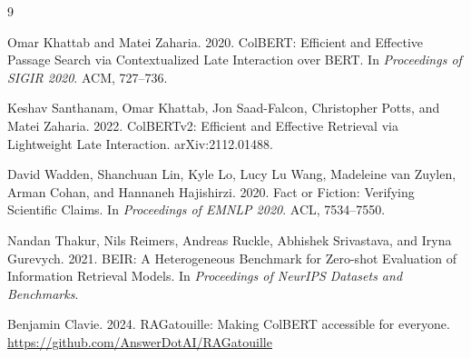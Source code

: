 \documentclass[sigconf,nonacm]{acmart}
\begin{document}
\begin{thebibliography}{9}

Omar Khattab and Matei Zaharia. 2020. ColBERT: Efficient and Effective Passage
Search via Contextualized Late Interaction over BERT. In \textit{Proceedings of
SIGIR 2020}. ACM, 727--736.

Keshav Santhanam, Omar Khattab, Jon Saad-Falcon, Christopher Potts, and Matei
Zaharia. 2022. ColBERTv2: Efficient and Effective Retrieval via Lightweight Late
Interaction. arXiv:2112.01488.

David Wadden, Shanchuan Lin, Kyle Lo, Lucy Lu Wang, Madeleine van Zuylen, Arman
Cohan, and Hannaneh Hajishirzi. 2020. Fact or Fiction: Verifying Scientific
Claims. In \textit{Proceedings of EMNLP 2020}. ACL, 7534--7550.

Nandan Thakur, Nils Reimers, Andreas Ruckle, Abhishek Srivastava, and Iryna
Gurevych. 2021. BEIR: A Heterogeneous Benchmark for Zero-shot Evaluation of
Information Retrieval Models. In \textit{Proceedings of NeurIPS Datasets and
Benchmarks}.

Benjamin Clavie. 2024. RAGatouille: Making ColBERT accessible for everyone.
\url{https://github.com/AnswerDotAI/RAGatouille}

\end{thebibliography}
\end{document}
